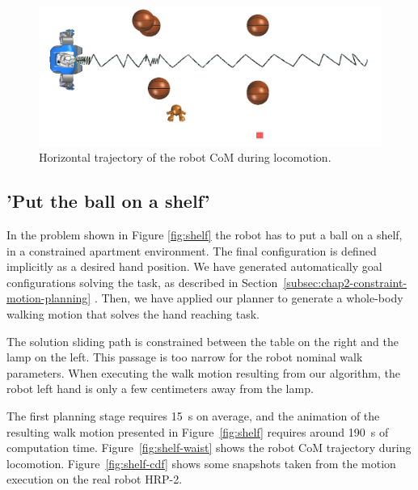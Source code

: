 \begin{figure}
  \centering
  \includegraphics[width=0.7\linewidth]
                  {src/chap2-wholebody-planning/pics/objects-cloud/waist-trajectory.png}

  \caption{Horizontal trajectory of the robot CoM during
    locomotion.}
  \label{fig:cluttered-waist} 
\end{figure}


\subsection{'Put the ball on a shelf'}
\label{sec:shelf}

In the problem shown in Figure \ref{fig:shelf} the robot has to put a
ball on a shelf, in a constrained apartment environment. The final
configuration is defined implicitly as a desired hand position. We
have generated automatically goal configurations solving the task, as
described in Section~\ref{subsec:chap2-constraint-motion-planning}
. Then, we have applied our planner to generate a whole-body walking
motion that solves the hand reaching task.

The solution sliding path is constrained between the table on the
right and the lamp on the left. This passage is too narrow for the
robot nominal walk parameters.  When executing the walk motion
resulting from our algorithm, the robot left hand is only a few
centimeters away from the lamp.

The first planning stage requires 15~s on average, and the animation
of the resulting walk motion presented in Figure~\ref{fig:shelf}
requires around 190~s of computation
time. Figure~\ref{fig:shelf-waist} shows the robot CoM trajectory
during locomotion. Figure~\ref{fig:shelf-cdf} shows some snapshots
taken from the motion execution on the real robot HRP-2.


